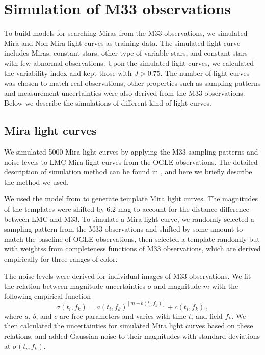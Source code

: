 \section{Simulation of M33 observations} \label{sec.simulation}







To build models for searching Miras from the M33 observations, we simulated Mira and Non-Mira light curves as training data. The simulated light curve includes Miras, constant stars, other type of variable stars, and constant stars with few abnormal observations. Upon the simulated light curves, we calculated the variability index and kept those with $J>0.75$. The number of light curves was chosen to match real observations, other properties such as sampling patterns and measurement uncertainties were also derived from the M33 observations. Below we describe the simulations of different kind of light curves.

\subsection{Mira light curves}
We simulated 5000 Mira light curves by applying the M33 sampling patterns and noise levels to LMC Mira light curves from the OGLE observations. The detailed description of simulation method can be found in , and here we briefly describe the method we used. 

We used the model from  to generate template Mira light curves. The magnitudes of the templates were shifted by 6.2 mag to account for the distance difference between LMC and M33. To simulate a Mira light curve, we randomly selected a sampling pattern from the M33 observations and shifted by some amount to match the baseline of OGLE observations, then selected a template randomly but with weightss from completeness functions of M33 observations, which are derived empirically for three ranges of color.

The noise levels were derived for individual images of M33 observations. We fit the relation between magnitude uncertainties $\sigma$ and magnitude $m$ with the following empirical function
\begin{equation}
\sigma(t_i,f_k) = a(t_i,f_k)^{[m-b(t_i,f_k)]} + c(t_i,f_k)\,, \label{equ.sigma.mag}
\end{equation}
where $a$, $b$, and $c$ are free parameters and varies with time $t_i$ and field $f_k$. We then calculated the uncertainties for simulated Mira light curves based on these relations, and added Gaussian noise to their magnitudes with standard deviations at $\sigma(t_i,f_k)$.

